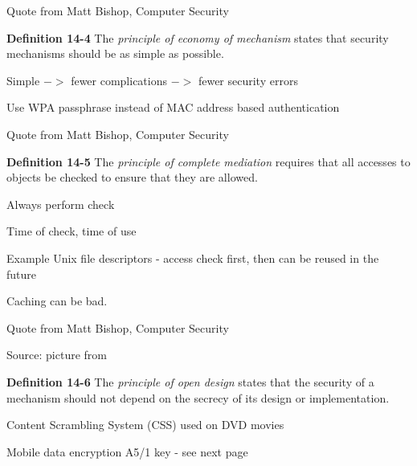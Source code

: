 \documentclass[Screen16to9,17pt]{foils}
\begin{document}
Quote from Matt Bishop, Computer Security



\begin{list1}
\item {\bf Definition 14-4} The \emph{principle of economy of mechanism} states that security mechanisms should be as simple as possible.
\item Simple $->$ fewer complications $->$ fewer security errors
\item Use WPA passphrase instead of MAC address based authentication
\item
\end{list1}

Quote from Matt Bishop, Computer Security



\begin{list1}
\item {\bf Definition 14-5} The \emph{principle of complete mediation} requires that all accesses to objects be checked to ensure that they are allowed.
\item Always perform check
\item Time of check, time of use
\item Example Unix file descriptors - access check first, then can be reused in the future
\item Caching can be bad.
\end{list1}

Quote from Matt Bishop, Computer Security




Source: picture from 
\begin{list1}
\item {\bf Definition 14-6} The \emph{principle of open design} states that the security of a mechanism should not depend on the secrecy of its design or implementation.
\item Content Scrambling System (CSS) used on DVD movies
\item Mobile data encryption  A5/1 key - see next page
\end{list1}



\end{document}
